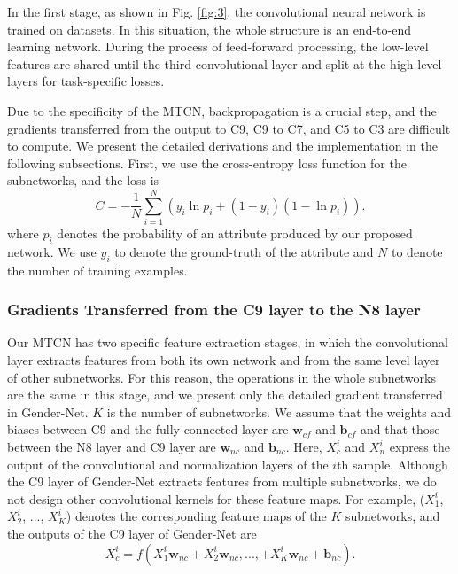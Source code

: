 \documentclass{sig-alternate-05-2015}
\begin{document}
In the first stage, as shown in Fig. \ref{fig:3}, the convolutional neural network is trained on datasets. In this situation, the whole structure is an end-to-end learning network. During the process of feed-forward processing, the low-level features are shared until the third convolutional layer and split at the high-level layers for task-specific losses.



Due to the specificity of the MTCN, backpropagation is a crucial step, and the gradients transferred from the output to C9, C9 to C7, and C5 to C3 are difficult to compute. We present the detailed derivations and the implementation in the following subsections. First, we use the cross-entropy loss function for the subnetworks, and the loss is
\begin{equation}\label{}
C =  - \frac{1}{N}\sum\limits_{i = 1}^N {\left( {{y_i}\ln {p_i} + (1 - {y_i})(1 - \ln {p_i})} \right)}.
\end{equation}
where $p_i$ denotes the probability of an attribute produced by our proposed network. We use $y_i$ to denote the ground-truth of the attribute and $N$ to denote the number of training examples.
\subsubsection{Gradients Transferred from the C9 layer to the N8 layer}
Our MTCN has two specific feature extraction stages, in which the convolutional layer extracts features from both its own network and from the same level layer of other subnetworks. For this reason, the operations in the whole subnetworks are the same in this stage, and we present only the detailed gradient transferred in Gender-Net. $K$ is the number of subnetworks. We assume that the weights and biases between C9 and the fully connected layer are $\textbf{w}_{cf}$ and $\textbf{b}_{cf}$ and that those between the N8 layer and C9 layer are $\textbf{w}_{nc}$ and $\textbf{b}_{nc}$. Here, $X_{c}^{i}$ and $X_{n}^{i}$ express the output of the convolutional and normalization layers of the $i$th sample. Although the C9 layer of Gender-Net extracts features from multiple subnetworks, we do not design other convolutional kernels for these feature maps. For example, ($X_1^i$, $X_2^i$, ..., $X_K^i$) denotes the corresponding feature maps of the $K$ subnetworks, and the outputs of the C9 layer of Gender-Net are
\begin{equation}\label{7}
X_{c}^i = f(X_1^i\textbf{w}_{nc} + X_2^i\textbf{w}_{nc}, ..., + X_K^i\textbf{w}_{nc} + \textbf{b}_{nc} ).
\end{equation}
\end{document}
